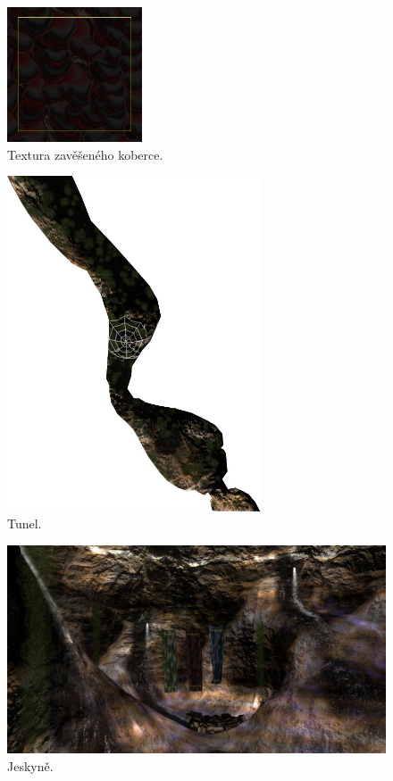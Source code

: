 \begin{figure}[h]
\centering
\includegraphics[width=4cm,keepaspectratio]{obr/koberec.jpg}
\caption{Textura zavěšeného koberce.}
\label{fig:koberec}
\end{figure}

\begin{figure}[h]
\centering
\includegraphics[width=7.5cm,keepaspectratio]{obr/tunel.jpg}
\caption{Tunel.}
\label{fig:tunel}
\end{figure}

\begin{figure}[h]
\centering
\includegraphics[width=15cm,keepaspectratio]{obr/jeskyne.jpg}
\caption{Jeskyně.}
\label{fig:jeskyne}
\end{figure}






